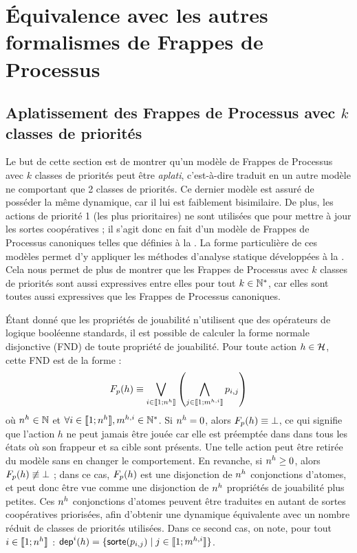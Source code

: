 \section{Équivalence avec les autres formalismes de Frappes de Processus}

\TODO





\subsection{Aplatissement des Frappes de Processus avec $k$ classes de priorités}

Le but de cette section est de montrer qu'un modèle de Frappes de Processus avec $k$ classes
de priorités peut être \emph{aplati}, c'est-à-dire traduit en un autre modèle ne comportant
que 2 classes de priorités.
Ce dernier modèle est assuré de posséder la même dynamique,
car il lui est faiblement bisimilaire.
De plus, les actions de priorité 1 (les plus prioritaires) ne sont utilisées que pour mettre
à jour les sortes coopératives ;
il s'agit donc en fait d'un modèle de Frappes de Processus canoniques telles que définies
à la .
La forme particulière de ces modèles permet d'y appliquer les méthodes d'analyse statique
développées à la .
Cela nous permet de plus de montrer que les Frappes de Processus avec $k$ classes de priorités
sont aussi expressives entre elles pour tout $k \in \mathbb{N}^*$,
car elles sont toutes aussi expressives que les Frappes de Processus canoniques.

Étant donné que les propriétés de jouabilité n'utilisent que des opérateurs de logique booléenne
standards, il est possible de calculer la forme normale disjonctive (FND) de toute propriété de
jouabilité. Pour toute action $h \in \mathcal{H}$, cette FND est de la forme :
\[F_{p}(h) \equiv \bigvee_{i \in \llbracket 1; n^{h} \rrbracket}
  \left( \bigwedge_{j \in \llbracket 1; m^{h,i} \rrbracket} p_{i,j} \right)\]
où $n^{h} \in \mathbb{N}$ et $\forall i \in \llbracket 1; n^{h} \rrbracket, m^{h,i} \in \mathbb{N}^*$.
Si $n^{h} = 0$, alors $F_{p}(h) \equiv \bot$, ce qui signifie que l'action $h$ ne peut jamais
être jouée car elle est préemptée dans dans tous les états où son frappeur et sa cible
sont présents.
Une telle action peut être retirée du modèle sans en changer le comportement.
En revanche, si $n^{h} \geq 0$, alors $F_{p}(h) \not\equiv \bot$ ;
dans ce cas, $F_{p}(h)$ est une disjonction de $n^{h}$ conjonctions d'atomes,
et peut donc être vue comme une disjonction de $n^{h}$ propriétés de jouabilité plus petites.
Ces $n^{h}$ conjonctions d'atomes peuvent être traduites en autant de sortes
coopératives priorisées, afin d'obtenir une dynamique équivalente avec un nombre réduit
de classes de priorités utilisées.
Dans ce second cas, on note, pour tout $i \in \llbracket 1; n^{h} \rrbracket$ :
$\mathsf{dep}^{i}(h) = \{ \mathsf{sorte}(p_{i,j}) \mid j \in \llbracket 1; m^{h,i} \rrbracket \}$.

